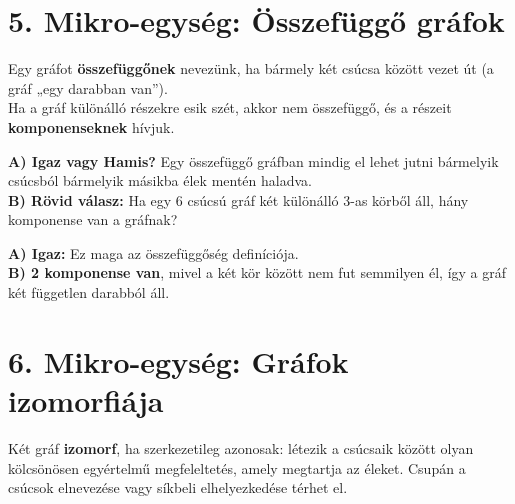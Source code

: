 \documentclass[a4paper,12pt]{article}
\begin{document}
\vspace{0.4cm}
\section{5. Mikro-egység: Összefüggő gráfok}

\begin{definiciodoboz}[Összefüggőség]
Egy gráfot \textbf{összefüggőnek} nevezünk, ha bármely két csúcsa között vezet út (a gráf „egy darabban van”). \\
Ha a gráf különálló részekre esik szét, akkor nem összefüggő, és a részeit \textbf{komponenseknek} hívjuk.
\end{definiciodoboz}

\begin{feladatdoboz}
\textbf{A) Igaz vagy Hamis?} Egy összefüggő gráfban mindig el lehet jutni bármelyik csúcsból bármelyik másikba élek mentén haladva. \\
\textbf{B) Rövid válasz:} Ha egy 6 csúcsú gráf két különálló 3-as körből áll, hány komponense van a gráfnak?
\end{feladatdoboz}

\begin{megoldasdoboz}
\textbf{A) Igaz:} Ez maga az összefüggőség definíciója. \\
\textbf{B) 2 komponense van}, mivel a két kör között nem fut semmilyen él, így a gráf két független darabból áll.
\end{megoldasdoboz}

\vspace{0.4cm}
\section{6. Mikro-egység: Gráfok izomorfiája}

\begin{definiciodoboz}
Két gráf \textbf{izomorf}, ha szerkezetileg azonosak: létezik a csúcsaik között olyan kölcsönösen egyértelmű megfeleltetés, amely megtartja az éleket. Csupán a csúcsok elnevezése vagy síkbeli elhelyezkedése térhet el.
\end{definiciodoboz}
\end{document}
